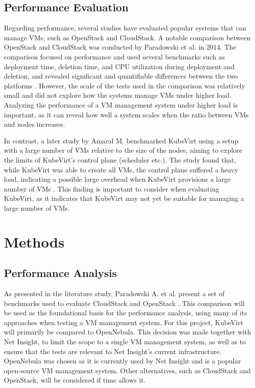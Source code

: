 \documentclass{article}
\begin{document}
\subsection{Performance Evaluation}
Regarding performance, several studies have evaluated popular systems that can manage VMs, such as OpenStack and CloudStack. A notable comparison between OpenStack and CloudStack was conducted by Paradowski et al. in 2014. The comparison focused on performance and used several benchmarks such as deployment time, deletion time, and CPU utilization during deployment and deletion, and revealed significant and quantifiable differences between the two platforms \cite{cs-os-benchmark}. However, the scale of the tests used in the comparison was relatively small and did not explore how the systems manage VMs under higher load. Analyzing the performance of a VM management system under higher load is important, as it can reveal how well a system scales when the ratio between VMs and nodes increases. 

In contrast, a later study by Amaral M. benchmarked KubeVirt using a setup with a large number of VMs relative to the size of the nodes, aiming to explore the limits of KubeVirt's control plane (scheduler etc.). The study found that, while KubeVirt was able to create all VMs, the control plane suffered a heavy load, indicating a possible large overhead when KubeVirt provisions a large number of VMs \cite{ibm-kubevirt-scale}. This finding is important to consider when evaluating KubeVirt, as it indicates that KubeVirt may not yet be suitable for managing a large number of VMs.

\newpage
\section{Methods}
\subsection{Performance Analysis}
As presented in the literature study, Paradowski A. et al. present a set of benchmarks used to evaluate CloudStack and OpenStack \cite{cs-os-benchmark}. This comparison will be used as the foundational basis for the performance analysis, using many of its approaches when testing a VM management system. For this project, KubeVirt will primarily be compared to OpenNebula. This decision was made together with Net Insight, to limit the scope to a single VM management system, as well as to ensure that the tests are relevant to Net Insight's current infrastructure. OpenNebula was chosen as it is currently used by Net Insight and is a popular open-source VM management system. Other alternatives, such as CloudStack and OpenStack, will be considered if time allows it. 
\end{document}

